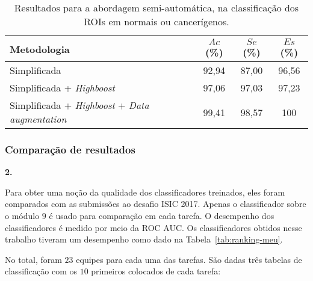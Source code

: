 \begin{table}[h]
\centering
\caption{Resultados para a abordagem semi-automática, na classificação dos ROIs em normais ou cancerígenos.}
\begin{tabular}{l|ccc}
Metodologia & $Ac$(\%) & $Se$(\%) & $Es$(\%)\\ 
\hline                         
\hline                         
Simplificada & 92,94 & 87,00 & 96,56 \\
Simplificada + \textit{Highboost} & 97,06 & 97,03 & 97,23 \\ 
Simplificada + \textit{Highboost} + \textit{Data augmentation} & 99,41 & 98,57 & 100 \\
\end{tabular}
\label{resultados_simplificados}
\end{table}

\subsubsection{Comparação de resultados}

\textbf{2. }

Para obter uma noção da qualidade dos classificadores treinados, eles foram comparados com as submissões ao desafio ISIC 2017. 
Apenas o classificador sobre o módulo $9$ é usado para comparação em cada tarefa. 
O desempenho dos classificadores é medido por meio da ROC AUC.
Os classificadores obtidos nesse trabalho tiveram um desempenho como dado na Tabela~\ref{tab:ranking-meu}.

\begin{table}[htb]
\end{table}

No total, foram $23$ equipes para cada uma das tarefas. 
São dadas três tabelas de classificação com os $10$ primeiros colocados de cada tarefa:

